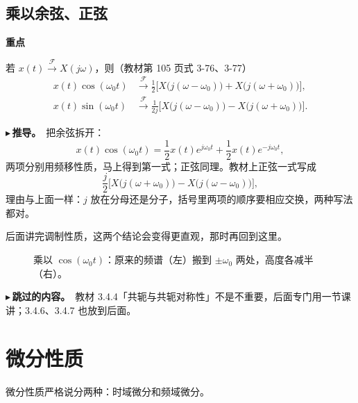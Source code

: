 \documentclass[UTF8,a4paper,11pt]{ctexart}
\newcommand{\F}{\mathcal{F}}
\newenvironment{remember}{\begin{rememberbox}\textbf{重点}\par\smallskip}{\end{rememberbox}}
\newcommand{\taxes}[5][t]{%
  \draw[->] (#2,0) -- (#3,0) node[right,font=\scriptsize] {$#1$};
  \draw[->] (0,#5) -- (0,#4);
  \node[anchor=north east,font=\tiny,gray!60!black,inner sep=1pt] at (0,-0.02) {$0$};}
\newcommand{\xt}[2]{\draw (#1,0) -- (#1,-0.1) node[anchor=north,font=\tiny,gray!60!black,fill=white,inner sep=0.6pt] {$#2$};}
\newcommand{\yt}[2]{\draw (0,#1) -- (-0.1,#1) node[anchor=east,font=\tiny,gray!60!black,fill=white,inner sep=0.6pt] {$#2$};}
\newcommand{\trip}[5][sig]{\draw[#1] (#2,0) -- (#3,#5) -- (#4,0);}
\newcounter{ex}[section]
\newcommand{\point}[1]{\par\addvspace{1ex}\noindent\textcolor{ptteal}{$\blacktriangleright$\,\textbf{#1}}\ }
\begin{document}
\subsection{乘以余弦、正弦}\label{sub:modu}
\begin{remember}
若 $x(t)\xrightarrow{\F}X(j\omega)$，则（教材第 105 页式 3-76、3-77）
\[
\begin{aligned}
x(t)\cos(\omega_0t)&\xrightarrow{\F}\frac12\Big[X\big(j(\omega-\omega_0)\big)+X\big(j(\omega+\omega_0)\big)\Big],\\
x(t)\sin(\omega_0t)&\xrightarrow{\F}\frac1{2j}\Big[X\big(j(\omega-\omega_0)\big)-X\big(j(\omega+\omega_0)\big)\Big].
\end{aligned}
\]
\end{remember}
\point{推导。}把余弦拆开：
\[
x(t)\cos(\omega_0t)=\frac12x(t)e^{j\omega_0t}+\frac12x(t)e^{-j\omega_0t},
\]
两项分别用频移性质，马上得到第一式；正弦同理。教材上正弦一式写成
\[
\frac j2\Big[X\big(j(\omega+\omega_0)\big)-X\big(j(\omega-\omega_0)\big)\Big],
\]
理由与上面一样：$j$ 放在分母还是分子，括号里两项的顺序要相应交换，两种写法都对。

后面讲完调制性质，这两个结论会变得更直观，那时再回到这里。

\begin{figure}[H]
\centering
{}
\hspace{6mm}
\caption{乘以 $\cos(\omega_0t)$：原来的频谱（左）搬到 $\pm\omega_0$ 两处，高度各减半（右）。}
\label{fig:modu}
\end{figure}

\point{跳过的内容。}教材 3.4.4「共轭与共轭对称性」不是不重要，后面专门用一节课讲；3.4.6、3.4.7 也放到后面。

\section{微分性质}\label{sec:diff}
微分性质严格说分两种：时域微分和频域微分。
\end{document}
